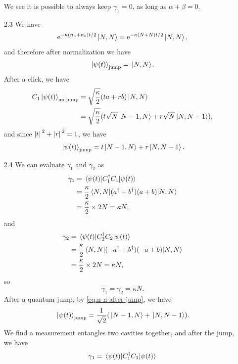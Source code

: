 \documentclass[hyperref, a4paper]{article}
\newcommand*{\ee}{\mathrm{e}}
\begin{document}
\begin{itemize}
We see it is possible to always keep $\gamma_1 = 0$, as long as $\alpha + \beta = 0$.
\item[2.3] We have 
\[
    \ee^{- \kappa (n_a + n_b) t / 2} \ket*{N, N} = \ee^{- \kappa (N + N) t / 2} \ket*{N, N},
\]
and therefore after normalization we have 
\begin{equation}
    \ket*{\psi(t)}_\text{jump} = \ket*{N, N}.
\end{equation}
After a click, we have 
\[
    \begin{aligned}
        C_1 \ket*{\psi(t)}_\text{no jump} &= \sqrt{\frac{\kappa}{2}} (t a + r b) \ket*{N, N} \\
        &= \sqrt{\frac{\kappa}{2}} (t \sqrt{N} \ket*{N-1, N} + r \sqrt{N} \ket*{N, N-1}),
    \end{aligned}
\]
and since $\abs*{t}^2 + \abs*{r}^2 = 1$, we have 
\begin{equation}
    \ket*{\psi(t)}_\text{jump} = t \ket*{N-1, N} + r \ket*{N, N-1}.
    \label{eq:n-n-after-jump}
\end{equation}
\item[2.4] We can evaluate $\gamma_1$ and $\gamma_2$ as 
\[
    \begin{aligned}
        \gamma_1 &= \expval*{C_1^\dagger C_1}{\psi(t)} \\
        &= \frac{\kappa}{2} \expval*{(a^\dagger + b^\dagger) (a + b)}{N, N} \\
        &= \frac{\kappa}{2} \times 2 N = \kappa N,
    \end{aligned}
\]  
and 
\[
    \begin{aligned}
        \gamma_2 &= \expval*{C_2^\dagger C_2}{\psi(t)} \\
        &= \frac{\kappa}{2} \expval*{(- a^\dagger + b^\dagger) (- a + b)}{N, N} \\
        &= \frac{\kappa}{2} \times 2 N = \kappa N,
    \end{aligned}
\]  
so 
\begin{equation}
    \gamma_1 = \gamma_2 = \kappa N.
\end{equation}
After a quantum jump, by \eqref{eq:n-n-after-jump}, we have 
\begin{equation}
    \ket*{\psi(t)}_\text{jump} = \frac{1}{\sqrt{2}} (\ket*{N-1,N} + \ket*{N,N-1}).
\end{equation}
We find a measurement entangles two cavities together, and after the jump, we have 
\[
    \begin{aligned}
        \gamma_1 &= \expval{C_1^\dagger C_1}{\psi(t)} \\

\end{aligned}\]
\end{itemize}
\end{document}
